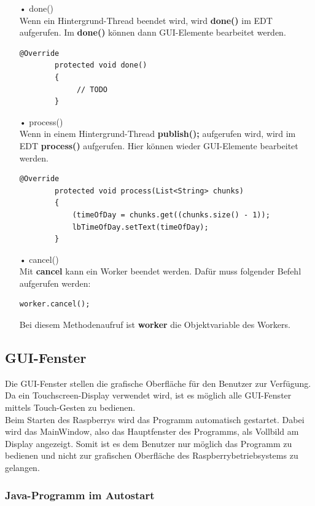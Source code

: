 \begin{itemize}
\item[•] done()
\\ Wenn ein Hintergrund-Thread beendet wird, wird \textbf{done()} im EDT aufgerufen. Im \textbf{done()} können dann GUI-Elemente bearbeitet werden.
\begin{lstlisting}[style=JavaStyle]
	    @Override
        protected void done()
        {
             // TODO
        }
\end{lstlisting}
\item[•] process()
\\ Wenn in einem Hintergrund-Thread \textbf{publish();} aufgerufen wird, wird im EDT \textbf{process()} aufgerufen. Hier können wieder GUI-Elemente bearbeitet werden.
\begin{lstlisting}[style=JavaStyle]
	    @Override
        protected void process(List<String> chunks)
        {
        	(timeOfDay = chunks.get((chunks.size() - 1));
            lbTimeOfDay.setText(timeOfDay);
        }
\end{lstlisting}
\item[•] cancel()
\\ Mit \textbf{cancel} kann ein Worker beendet werden. Dafür muss folgender Befehl aufgerufen werden:
\begin{lstlisting}[style=JavaStyle]
	    worker.cancel();
\end{lstlisting}
Bei diesem Methodenaufruf ist \textbf{worker} die Objektvariable des Workers.
\end{itemize}

\subsection{GUI-Fenster}
Die GUI-Fenster stellen die grafische Oberfläche für den Benutzer zur Verfügung. Da ein Touchscreen-Display verwendet wird, ist es möglich alle GUI-Fenster mittels Touch-Gesten zu bedienen. 
\\ Beim Starten des Raspberrys wird das Programm automatisch gestartet. Dabei wird das MainWindow, also das Hauptfenster des Programms, als Vollbild am Display angezeigt. Somit ist es dem Benutzer nur möglich das Programm zu bedienen und nicht zur grafischen Oberfläche des Raspberrybetriebsystems zu gelangen.

\subsubsection{Java-Programm im Autostart}

\newpage

